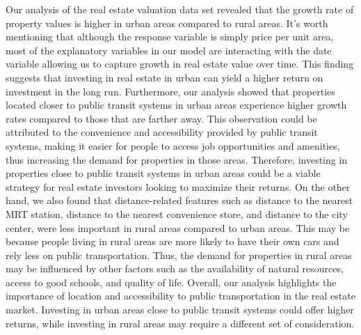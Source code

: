 Our analysis of the real estate valuation data set revealed that the growth rate of property values is higher in urban areas
compared to rural areas. It's worth mentioning that although the response variable is simply price per unit area, most of the
explanatory variables in our model are interacting with the date variable allowing us to capture growth in real estate value over
time. This finding suggests that investing in real estate in urban can yield a higher return on investment in the long run.
Furthermore, our analysis showed that properties located closer to public transit systems in urban areas experience higher growth
rates compared to those that are farther away. This observation could be attributed to the convenience and accessibility provided
by public transit systems, making it easier for people to access job opportunities and amenities, thus increasing the demand for
properties in those areas. Therefore, investing in properties close to public transit systems in urban areas could be a viable
strategy for real estate investors looking to maximize their returns. On the other hand, we also found that distance-related
features such as distance to the nearest MRT station, distance to the nearest convenience store, and distance to the city center,
were less important in rural areas compared to urban areas. This may be because people living in rural areas are more likely to
have their own cars and rely less on public transportation. Thus, the demand for properties in rural areas may be influenced by
other factors such as the availability of natural resources, access to good schools, and quality of life. Overall, our analysis
highlights the importance of location and accessibility to public transportation in the real estate market. Investing in urban
areas close to public transit systems could offer higher returns, while investing in rural areas may require a different set of
consideration. 
